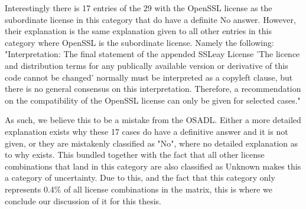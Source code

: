 \begin{enumerate}
	Interestingly there is 17 entries of the 29 with the OpenSSL license as the subordinate license in this category that do have a definite No answer. However, their explanation is the same explanation given to all other entries in this category where OpenSSL is the subordinate license. Namely the following: "Interpretation: The final statement of the appended SSLeay License 'The licence and distribution terms for any publically available version or derivative of this code cannot be changed' normally must be interpreted as a copyleft clause, but there is no general consensus on this interpretation. Therefore, a recommendation on the compatibility of the OpenSSL license can only be given for selected cases."
	
	As such, we believe this to be a mistake from the OSADL. Either a more detailed explanation exists why these 17 cases do have a definitive answer and it is not given, or they are mistakenly classified as "No", where no detailed explanation as to why exists. This bundled together with the fact that all other license combinations that land in this category are also classified as Unknown makes this a category of uncertainty. Due to this, and the fact that this category only represents 0.4\% of all license combinations in the matrix, this is where we conclude our discussion of it for this thesis.
\end{enumerate}